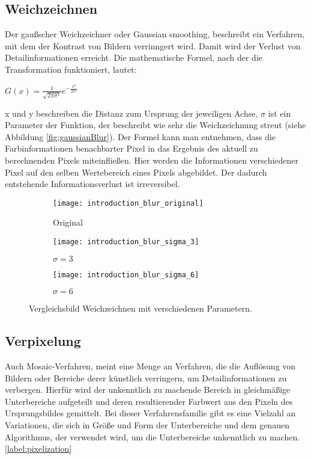 \documentclass[
12pt, %
a4paper, %
oneside, %
headinclude,footinclude, %
BCOR5mm, %
german]{scrartcl}
\begin{document}
\subsection{Weichzeichnen}
Der gaußscher Weichzeichner oder Gaussian smoothing, beschreibt ein Verfahren, mit dem der Kontrast von Bildern
verrinngert wird. Damit wird der Verlust von Detailinformationen erreicht. Die mathematische Formel, nach der die
Transformation funktioniert, lautet:

\parskip\baselineskip
\(G(x) = \frac{1}{\sqrt{2 \pi \sigma^2}} e^{-\frac{x^2}{2 \sigma^2}}\)
\par
\par

x und y beschreiben die Distanz zum Ursprung der jeweiligen Achse, \(\sigma\) ist ein Parameter der Funktion, der
beschreibt wie sehr die Weichzeichnung streut (siehe Abbildung  \vref*{fig:gaussianBlur}).
Der Formel kann man entnehmen, dass die
Farbinformationen benachbarter Pixel in das Ergebnis des aktuell zu berechnenden Pixels miteinfließen. Hier werden
die Informationen verschiedener Pixel auf den selben Wertebereich eines Pixels abgebildet. Der dadurch entstehende
Informationsverlust ist irreversibel.

\begin{figure}[h]
    \centering
    \begin{subfigure}{0.3\textwidth}
        \texttt{[image: introduction\_blur\_original]}
        \caption{Original}
    \end{subfigure}
    \begin{subfigure}{0.3\textwidth}
        \texttt{[image: introduction\_blur\_sigma\_3]}
        \caption{\(\sigma = 3\)}
    \end{subfigure}
    \begin{subfigure}{0.3\textwidth}
        \texttt{[image: introduction\_blur\_sigma\_6]}
        \caption{\(\sigma = 6\)}
    \end{subfigure}

    \caption{Vergleichsbild Weichzeichnen mit verschiedenen Parametern.}
    \label{fig:gaussianBlur}
\end{figure}

\subsection{Verpixelung}
Auch Mosaic-Verfahren, meint eine Menge an Verfahren, die die Auflösung von Bildern oder Bereiche derer künstlich
verringern, um Detailinformationen zu verbergen. Hierfür wird der unkenntlich zu machende Bereich in gleichmäßige
Unterbereiche aufgeteilt und deren resultierender Farbwert aus den Pixeln des Ursprungsbildes gemittelt. Bei dieser
Verfahrensfamilie gibt es eine Vielzahl an Variationen, die sich in Größe und Form der Unterbereiche und dem genauen
Algorithmus, der verwendet wird, um die Unterbereiche unkenntlich zu machen. \ref{label:pixelization}
\end{document}
